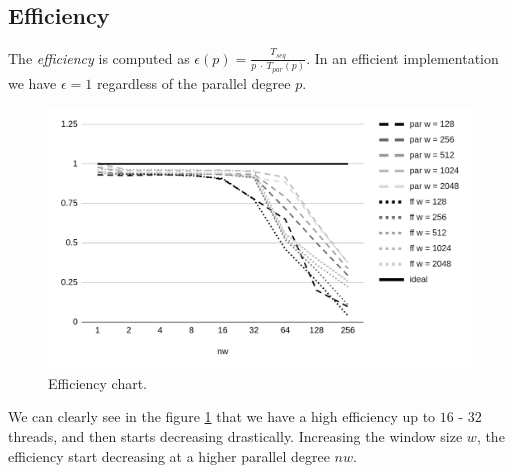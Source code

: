 \subsection{Efficiency}
The \textit{efficiency} is computed as $\epsilon(p) = \frac{T_{seq}}{p\ \cdot\ T_{par}(p)}$. In an efficient implementation we have $\epsilon = 1$ regardless of the parallel degree $p$.

\begin{figure}[H]
    \centering
    \includegraphics[width=.75\linewidth]{assets/efficiency_ideal}
    \caption{Efficiency chart.}
    \label{fig:efficiency}
\end{figure}

\noindent
We can clearly see in the figure \ref{fig:efficiency} that we have a high efficiency up to $16$ - $32$ threads, and then starts decreasing drastically. Increasing the window size $w$, the efficiency start decreasing at a higher parallel degree $nw$.